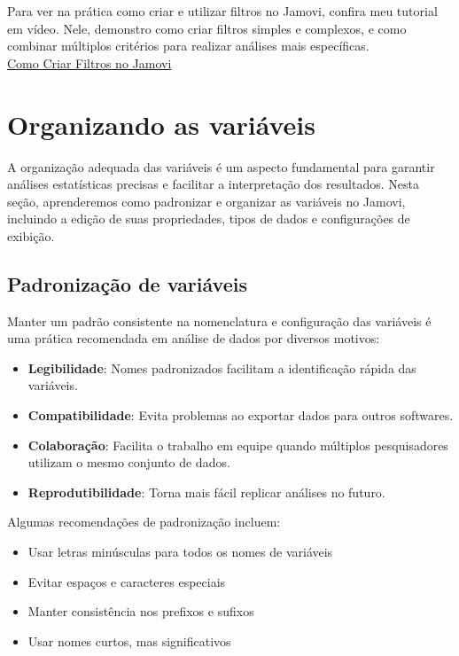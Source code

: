 \begin{tcolorbox}[colback=white,colframe=red,title={\faPlayCircle \ Dica de Conteúdo}]
  Para ver na prática como criar e utilizar filtros no Jamovi, confira meu tutorial em vídeo. Nele, demonstro como criar filtros simples e complexos, e como combinar múltiplos critérios para realizar análises mais específicas.\\
  \textcolor{red}{\faYoutube} \href{https://youtu.be/U6sFx7vQhdc?si=rpdJF2qgNyWCO11a}{Como Criar Filtros no Jamovi}
\end{tcolorbox}

\section{Organizando as variáveis}

A organização adequada das variáveis é um aspecto fundamental para garantir análises estatísticas precisas e facilitar a interpretação dos resultados. Nesta seção, aprenderemos como padronizar e organizar as variáveis no Jamovi, incluindo a edição de suas propriedades, tipos de dados e configurações de exibição.

\subsection{Padronização de variáveis}

Manter um padrão consistente na nomenclatura e configuração das variáveis é uma prática recomendada em análise de dados por diversos motivos:

\begin{itemize}
    \item \textbf{Legibilidade}: Nomes padronizados facilitam a identificação rápida das variáveis.
    \item \textbf{Compatibilidade}: Evita problemas ao exportar dados para outros softwares.
    \item \textbf{Colaboração}: Facilita o trabalho em equipe quando múltiplos pesquisadores utilizam o mesmo conjunto de dados.
    \item \textbf{Reprodutibilidade}: Torna mais fácil replicar análises no futuro.
\end{itemize}

Algumas recomendações de padronização incluem:
\begin{itemize}
    \item Usar letras minúsculas para todos os nomes de variáveis
    \item Evitar espaços e caracteres especiais
    \item Manter consistência nos prefixos e sufixos
    \item Usar nomes curtos, mas significativos
\end{itemize}

